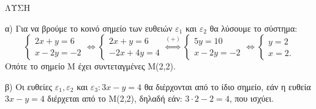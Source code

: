 ΛΥΣΗ

α) Για να βρούμε το κοινό σημείο των ευθειών $\varepsilon_1$ και $\varepsilon_2$ θα λύσουμε το σύστημα:
\[
\begin{cases}
2x + y = 6 \\
x - 2y = -2
\end{cases}
\Leftrightarrow
\begin{cases}
2x + y = 6 \\
-2x + 4y = 4
\end{cases}
\overset{(+)}{\Leftrightarrow}
\begin{cases}
5y = 10 \\
x - 2y = -2
\end{cases}
\Leftrightarrow
\begin{cases}
y = 2 \\
x = 2.
\end{cases}
\]
Οπότε το σημείο M έχει συντεταγμένες M(2,2).

β) Οι ευθείες $\varepsilon_1, \varepsilon_2$ και $\varepsilon_3: 3x-y=4$ θα διέρχονται από το ίδιο σημείο, εάν η ευθεία $3x-y=4$ διέρχεται από το M(2,2), δηλαδή εάν: $3 \cdot 2 - 2 = 4$, που ισχύει.
\lyshEntryEnd